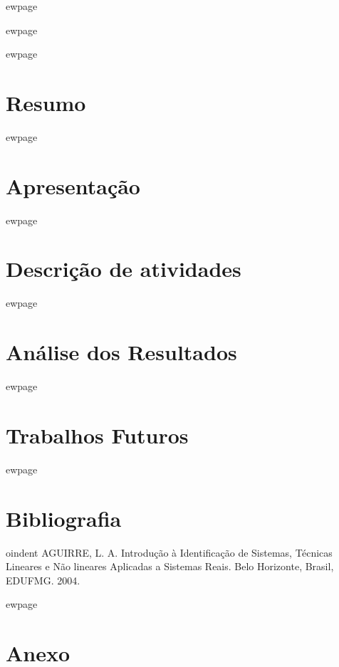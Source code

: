 \documentclass[a4paper, 12pt]{article}
\begin{document}
ewpage

ewpage
\tableofcontents
\thispagestyle{empty}


ewpage
\section{Resumo}

ewpage
\section{Apresentação}

ewpage

\section{Descrição de atividades}


ewpage
\section{Análise dos Resultados}

ewpage
\section{Trabalhos Futuros}

ewpage

\section*{Bibliografia}
\footnotesize{


oindent AGUIRRE, L. A. Introdução à Identificação de Sistemas, Técnicas Lineares e Não lineares Aplicadas a Sistemas Reais. Belo Horizonte, Brasil, EDUFMG. 2004.\\

}

ewpage
\section*{Anexo}
\end{document}
